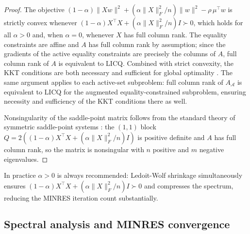 \documentclass{siam/siamart}
\begin{document}
\begin{proof}
The objective $(1-\alpha)\|Xw\|^2 + (\alpha\|X\|_F^2/n)\|w\|^2 - \rho\,\mu^\top w$ is strictly
convex whenever $(1-\alpha)X^\top X + (\alpha\|X\|_F^2/n)I \succ 0$, which holds for all $\alpha > 0$
and, when $\alpha = 0$, whenever $X$ has full column rank.  The equality constraints
are affine and $A$ has full column rank by assumption; since the gradients of the
active equality constraints are precisely the columns of $A$, full column rank of $A$
is equivalent to LICQ.  Combined with strict convexity, the KKT conditions are both
necessary and sufficient for global optimality \cite[Ch.~5]{boyd2004}.  The same
argument applies to each active-set subproblem: full column rank of $A_{\mathcal{A}}$
is equivalent to LICQ for the augmented equality-constrained subproblem, ensuring
necessity and sufficiency of the KKT conditions there as well.

Nonsingularity of the saddle-point matrix follows from the standard theory of
symmetric saddle-point systems \cite{benzi2005}: the $(1,1)$ block
$Q = 2((1-\alpha)X^\top X + (\alpha\|X\|_F^2/n)I)$ is positive definite and $A$ has full column rank, so
the matrix is nonsingular with $n$ positive and $m$ negative eigenvalues.
\end{proof}

\begin{remark}
In practice $\alpha > 0$ is always recommended: Ledoit-Wolf shrinkage
simultaneously ensures $(1-\alpha)X^\top X + (\alpha\|X\|_F^2/n)I \succ 0$
and compresses the spectrum, reducing the MINRES iteration count substantially.
\end{remark}

\subsection{Spectral analysis and MINRES convergence}\label{sec:spectrum}
\end{document}

